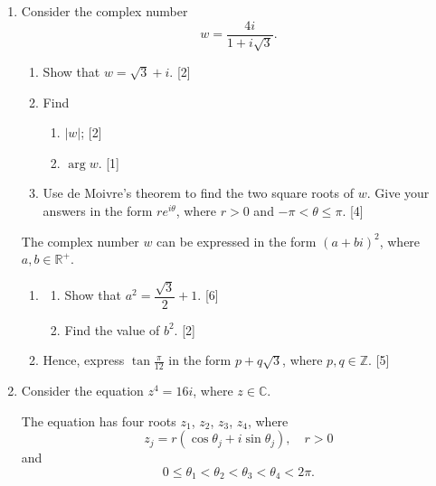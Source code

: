 \documentclass[12pt, twoside]{article}
\begin{document}
\begin{enumerate}[itemsep=0.15cm]
\newpage

\item[3.] 

Consider the complex number
\[
w = \frac{4i}{1 + i\sqrt{3}}.
\]

\begin{enumerate}[itemsep=0.15cm]
  \item Show that $w = \sqrt{3} + i$. \hfill [2]
  \item Find
  \begin{enumerate}[itemsep=0.15cm]
    \item[(i)] $|w|$; \hfill [2]
    \item[(ii)] $\arg w$. \hfill [1]
  \end{enumerate}
  \item Use de Moivre's theorem to find the two square roots of $w$.
  Give your answers in the form $re^{i\theta}$, where $r > 0$ and
  $-\pi < \theta \leq \pi$. \hfill [4]
\end{enumerate}

The complex number $w$ can be expressed in the form $(a + bi)^2$,
where $a, b \in \mathbb{R}^{+}$.

\begin{enumerate}[itemsep=0.15cm]
  \item[(d)] \begin{enumerate}[itemsep=0.15cm]
    \item[(i)] Show that $a^2 = \dfrac{\sqrt{3}}{2} + 1$. \hfill [6]
    \item[(ii)] Find the value of $b^2$. \hfill [2]
  \end{enumerate}
  \item[(e)] Hence, express $\tan\frac{\pi}{12}$ in the form
  $p + q\sqrt{3}$, where $p, q \in \mathbb{Z}$. \hfill [5]
\end{enumerate}

\newpage

\item[4.] 

Consider the equation $z^4 = 16i$, where $z \in \mathbb{C}$.

The equation has four roots $z_1$, $z_2$, $z_3$, $z_4$, where
\[
z_j = r\left(\cos\theta_j + i\sin\theta_j\right), \quad r > 0
\]
and
\[
0 \leq \theta_1 < \theta_2 < \theta_3 < \theta_4 < 2\pi.
\]


\end{enumerate}
\end{document}
